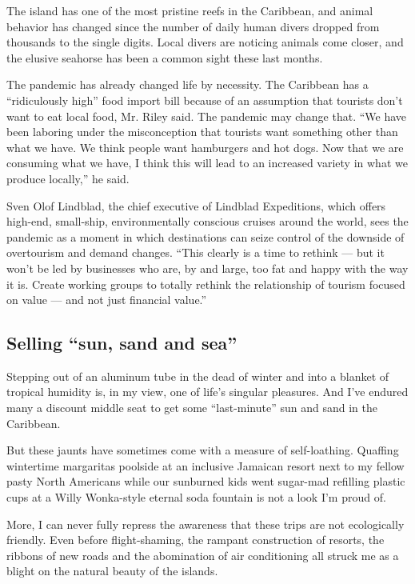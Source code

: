 The island has one of the most pristine reefs in the Caribbean, and
animal behavior has changed since the number of daily human divers
dropped from thousands to the single digits. Local divers are noticing
animals come closer, and the elusive seahorse has been a common sight
these last months.

The pandemic has already changed life by necessity. The Caribbean has a
``ridiculously high'' food import bill because of an assumption that
tourists don't want to eat local food, Mr. Riley said. The pandemic may
change that. ``We have been laboring under the misconception that
tourists want something other than what we have. We think people want
hamburgers and hot dogs. Now that we are consuming what we have, I think
this will lead to an increased variety in what we produce locally,'' he
said.

Sven Olof Lindblad, the chief executive of Lindblad Expeditions, which
offers high-end, small-ship, environmentally conscious cruises around
the world, sees the pandemic as a moment in which destinations can seize
control of the downside of overtourism and demand changes. ``This
clearly is a time to rethink --- but it won't be led by businesses who
are, by and large, too fat and happy with the way it is. Create working
groups to totally rethink the relationship of tourism focused on value
--- and not just financial value.''

\hypertarget{selling-sun-sand-and-sea}{%
\subsection{Selling ``sun, sand and
sea''}\label{selling-sun-sand-and-sea}}

Stepping out of an aluminum tube in the dead of winter and into a
blanket of tropical humidity is, in my view, one of life's singular
pleasures. And I've endured many a discount middle seat to get some
``last-minute'' sun and sand in the Caribbean.

But these jaunts have sometimes come with a measure of self-loathing.
Quaffing wintertime margaritas poolside at an inclusive Jamaican resort
next to my fellow pasty North Americans while our sunburned kids went
sugar-mad refilling plastic cups at a Willy Wonka-style eternal soda
fountain is not a look I'm proud of.

More, I can never fully repress the awareness that these trips are not
ecologically friendly. Even before flight-shaming, the rampant
construction of resorts, the ribbons of new roads and the abomination of
air conditioning all struck me as a blight on the natural beauty of the
islands.

